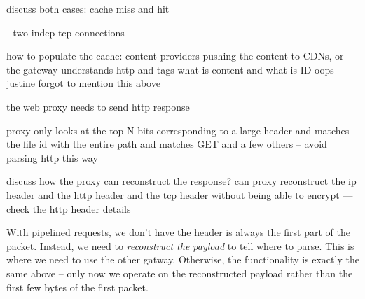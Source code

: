 discuss both cases: cache miss and hit

- two indep tcp connections 

how to populate the cache: content providers pushing the content to CDNs, or the gateway understands
http and tags what is content and what is ID
oops justine forgot to mention this above

the web proxy needs to send http response 

proxy only looks at the top N bits corresponding to a large header and matches the file id with the entire path
and matches GET and a few others -- avoid parsing http this way


discuss how the proxy can reconstruct the response?
can proxy reconstruct the ip header and the http header  and the tcp header without being able to encrypt
--- check the http header details

With pipelined requests, we don't have the header is always the first part of the packet. Instead, we need to {\it reconstruct the payload} to tell where to parse. This is where we need to use the other gatway. Otherwise, the functionality is exactly the same above -- only now we operate on the reconstructed payload rather than the first few bytes of the first packet.


